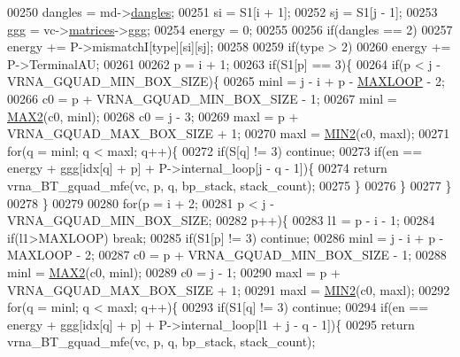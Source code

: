 \begin{DoxyCode}
00250   dangles     = md->\hyperlink{group__model__details_adcda4ff2ea77748ae0e8700288282efc}{dangles};
00251   si          = S1[i + 1];
00252   sj          = S1[j - 1];
00253   ggg         = vc->\hyperlink{group__fold__compound_aca8be7bdc65bafe2172c6ee777f18568}{matrices}->\hyperlink{group__dp__matrices_a0b7b86a5c75c96eabb89eb53a13e7164}{ggg};
00254   energy      = 0;
00255 
00256   \textcolor{keywordflow}{if}(dangles == 2)
00257     energy += P->mismatchI[type][si][sj];
00258 
00259   \textcolor{keywordflow}{if}(type > 2)
00260     energy += P->TerminalAU;
00261 
00262   p = i + 1;
00263   \textcolor{keywordflow}{if}(S1[p] == 3)\{
00264     \textcolor{keywordflow}{if}(p < j - VRNA\_GQUAD\_MIN\_BOX\_SIZE)\{
00265       minl  = j - i + p - \hyperlink{energy__const_8h_ad1bd6eabac419670ddd3c9ed82145988}{MAXLOOP} - 2;
00266       c0    = p + VRNA\_GQUAD\_MIN\_BOX\_SIZE - 1;
00267       minl  = \hyperlink{group__utils_ga33297b3679c713b0c4d897cd0fe3b122}{MAX2}(c0, minl);
00268       c0    = j - 3;
00269       maxl  = p + VRNA\_GQUAD\_MAX\_BOX\_SIZE + 1;
00270       maxl  = \hyperlink{group__utils_gae0b9cd0ce090bd69b951aa73e8fa4f7d}{MIN2}(c0, maxl);
00271       \textcolor{keywordflow}{for}(q = minl; q < maxl; q++)\{
00272         \textcolor{keywordflow}{if}(S[q] != 3) \textcolor{keywordflow}{continue};
00273         \textcolor{keywordflow}{if}(en == energy + ggg[idx[q] + p] + P->internal\_loop[j - q - 1])\{
00274           \textcolor{keywordflow}{return} vrna\_BT\_gquad\_mfe(vc, p, q, bp\_stack, stack\_count);
00275         \}
00276       \}
00277     \}
00278   \}
00279 
00280   \textcolor{keywordflow}{for}(p = i + 2;
00281       p < j - VRNA\_GQUAD\_MIN\_BOX\_SIZE;
00282       p++)\{
00283     l1    = p - i - 1;
00284     \textcolor{keywordflow}{if}(l1>MAXLOOP) \textcolor{keywordflow}{break};
00285     \textcolor{keywordflow}{if}(S1[p] != 3) \textcolor{keywordflow}{continue};
00286     minl  = j - i + p - MAXLOOP - 2;
00287     c0    = p + VRNA\_GQUAD\_MIN\_BOX\_SIZE - 1;
00288     minl  = \hyperlink{group__utils_ga33297b3679c713b0c4d897cd0fe3b122}{MAX2}(c0, minl);
00289     c0    = j - 1;
00290     maxl  = p + VRNA\_GQUAD\_MAX\_BOX\_SIZE + 1;
00291     maxl  = \hyperlink{group__utils_gae0b9cd0ce090bd69b951aa73e8fa4f7d}{MIN2}(c0, maxl);
00292     \textcolor{keywordflow}{for}(q = minl; q < maxl; q++)\{
00293       \textcolor{keywordflow}{if}(S1[q] != 3) \textcolor{keywordflow}{continue};
00294       \textcolor{keywordflow}{if}(en == energy + ggg[idx[q] + p] + P->internal\_loop[l1 + j - q - 1])\{
00295         \textcolor{keywordflow}{return} vrna\_BT\_gquad\_mfe(vc, p, q, bp\_stack, stack\_count);

\end{DoxyCode}
